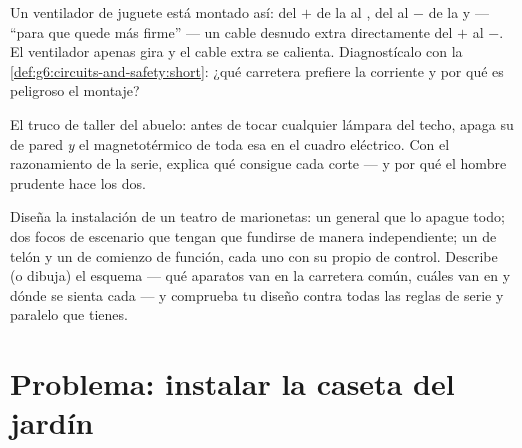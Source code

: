 \begin{exercise}[$\star\star$]\label{exo:g6:circuits-and-safety:10}
Un ventilador de juguete está montado así: del $+$ de la  al
, del  al $-$ de la  y --- ``para que
quede más firme'' --- un cable desnudo extra directamente del $+$ al
$-$. El ventilador apenas gira y el cable extra se calienta.
Diagnostícalo con la \cref{def:g6:circuits-and-safety:short}: ¿qué
carretera prefiere la corriente y por qué es peligroso el montaje?
\end{exercise}

\begin{exercise}[$\star\star$]\label{exo:g6:circuits-and-safety:11}
El truco de taller del abuelo: antes de tocar cualquier lámpara del
techo, apaga su  de pared \emph{y} el magnetotérmico de
toda esa  en el cuadro eléctrico. Con el razonamiento de la
serie, explica qué consigue cada corte --- y por qué el hombre
prudente hace los dos.
\end{exercise}

\begin{exercise}[$\star\star\star$]\label{exo:g6:circuits-and-safety:12}
Diseña la instalación de un teatro de marionetas: un
 general que lo apague todo; dos focos de escenario que
tengan que fundirse de manera independiente; un  de telón y un
 de comienzo de función, cada uno con su propio
 de control. Describe (o dibuja) el esquema --- qué
aparatos van en la carretera común, cuáles van en  y dónde se
sienta cada  --- y comprueba tu diseño contra todas las
reglas de serie y paralelo que tienes.
\end{exercise}

\section{Problema: instalar la caseta del jardín}

